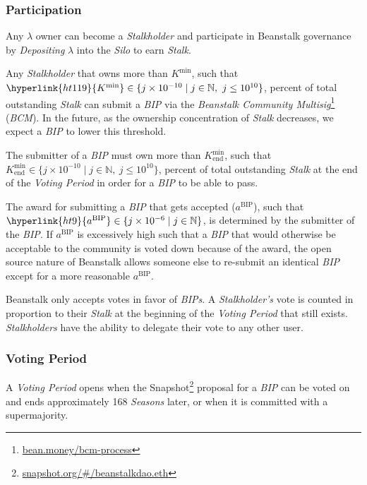 \documentclass[tikz]{article}
\newcommand{\term}[1]{\textsl{#1}}
\newcommand{\fref}[1]{\footnote{\href{http://#1}{#1}}}
\begin{document}
\subsubsection{Participation}
\vspace*{-1mm}
Any \hyperlink{ht126}{$\lambda$} owner can become a \term{Stalkholder} and participate in Beanstalk governance by \term{Depositing} \hyperlink{ht126}{$\lambda$} into the \term{Silo} to earn \term{Stalk}.

Any \term{Stalkholder} that owns more than \hyperlink{ht119}{$K^{\text{min}}$}, such that $\hyperlink{ht119}{K^{\text{min}}} \in \{j \times 10^{-10} \mid j \in \mathbb{N},\ j \leq 10^{10} \}$, percent of total outstanding \term{Stalk} can submit a \term{BIP} via the \term{Beanstalk Community Multisig}\fref{bean.money/bcm-process} (\term{BCM}). In the future, as the ownership concentration of \term{Stalk} decreases, we expect a \term{BIP} to lower this threshold.

The submitter of a \term{BIP} must own more than $K_{\text{end}}^{\text{min}}$, such that $K_{\text{end}}^{\text{min}} \in \{j \times 10^{-10} \mid j \in \mathbb{N},\ j \leq 10^{10} \}$, percent of total outstanding \term{Stalk} at the end of the \term{Voting Period} in order for a \term{BIP} to be able to pass.

The award for submitting a \term{BIP} that gets accepted (\hyperlink{ht9}{$a^{\text{BIP}}$}), such that $\hyperlink{ht9}{a^{\text{BIP}}} \in \{j \times 10^{-6} \mid j \in \mathbb{N} \}$, is determined by the submitter of the \term{BIP}. If \hyperlink{ht9}{$a^{\text{BIP}}$} is excessively high such that a \term{BIP} that would otherwise be acceptable to the community is voted down because of the award, the open source nature of Beanstalk allows someone else to re-submit an identical \term{BIP} except for a more reasonable \hyperlink{ht9}{$a^{\text{BIP}}$}.

Beanstalk only accepts votes in favor of \term{BIPs}. A \term{Stalkholder's} vote is counted in proportion to their \term{Stalk} at the beginning of the \term{Voting Period} that still exists. \term{Stalkholders} have the ability to delegate their vote to any other user.

\subsubsection{Voting Period}
\vspace*{-1mm}
A \term{Voting Period} opens when the Snapshot\fref{snapshot.org/\#/beanstalkdao.eth} proposal for a \term{BIP} can be voted on and ends approximately 168 \term{Seasons} later, or when it is committed with a supermajority.
\end{document}
